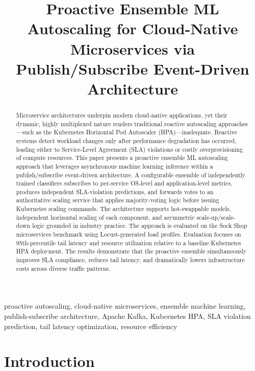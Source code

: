 \documentclass[conference]{IEEEtran}
\begin{document}
\title{Proactive Ensemble ML Autoscaling for Cloud-Native Microservices via Publish/Subscribe Event-Driven Architecture}



\maketitle

\begin{abstract}
Microservice architectures underpin modern cloud-native applications, yet their dynamic, highly multiplexed nature renders traditional reactive autoscaling approaches---such as the Kubernetes Horizontal Pod Autoscaler (HPA)---inadequate. Reactive systems detect workload changes only after performance degradation has occurred, leading either to Service-Level Agreement (SLA) violations or costly overprovisioning of compute resources. This paper presents a proactive ensemble ML autoscaling approach that leverages asynchronous machine learning inference within a publish/subscribe event-driven architecture. A configurable ensemble of independently trained classifiers subscribes to per-service OS-level and application-level metrics, produces independent SLA-violation predictions, and forwards votes to an authoritative scaling service that applies majority-voting logic before issuing Kubernetes scaling commands. The architecture supports hot-swappable models, independent horizontal scaling of each component, and asymmetric scale-up/scale-down logic grounded in industry practice. The approach is evaluated on the Sock Shop microservices benchmark using Locust-generated load profiles. Evaluation focuses on 95th-percentile tail latency and resource utilization relative to a baseline Kubernetes HPA deployment. The results demonstrate that the proactive ensemble simultaneously improves SLA compliance, reduces tail latency, and dramatically lowers infrastructure costs across diverse traffic patterns.
\end{abstract}

\begin{IEEEkeywords}
proactive autoscaling, cloud-native microservices, ensemble machine learning, publish-subscribe architecture, Apache Kafka, Kubernetes HPA, SLA violation prediction, tail latency optimization, resource efficiency
\end{IEEEkeywords}

\section{Introduction}
\end{document}

